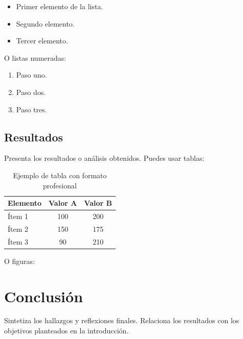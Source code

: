 \documentclass[12pt, letterpaper]{article}
\begin{document}
\begin{itemize}[leftmargin=1.5em, itemsep=2pt]
  \item Primer elemento de la lista.
  \item Segundo elemento.
  \item Tercer elemento.
\end{itemize}

O listas numeradas:

\begin{enumerate}[leftmargin=1.5em, itemsep=2pt]
  \item Paso uno.
  \item Paso dos.
  \item Paso tres.
\end{enumerate}

\subsection{Resultados}

Presenta los resultados o análisis obtenidos. Puedes usar tablas:

\begin{table}[htbp]
  \centering
  \caption{Ejemplo de tabla con formato profesional}
  \renewcommand{\arraystretch}{1.3}
  \begin{tabular}{@{}lcc@{}}
    \toprule
    \textbf{Elemento} & \textbf{Valor A} & \textbf{Valor B} \\
    \midrule
    \rowcolor{fondoTabla} Ítem 1 & 100 & 200 \\
    Ítem 2 & 150 & 175 \\
    \rowcolor{fondoTabla} Ítem 3 & 90  & 210 \\
    \bottomrule
  \end{tabular}
  \label{tab:ejemplo}
\end{table}

O figuras:


\section{Conclusión}

Sintetiza los hallazgos y reflexiones finales. Relaciona los resultados con los objetivos planteados en la introducción.

\newpage

\end{document}
